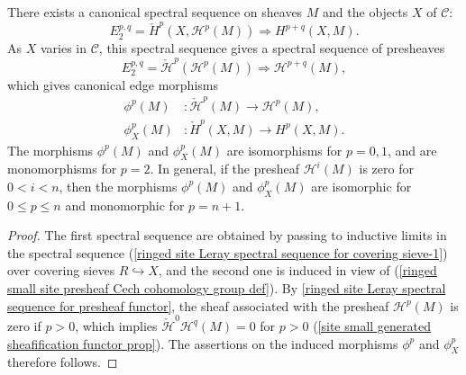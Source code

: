 \begin{corollary}\label{ringed site Cech to derive spectral sequence}
There exists a canonical spectral sequence on sheaves $M$ and the objects $X$ of $\mathcal{C}$:
\begin{equation}\label{ringed site Cech to derive spectral sequence-1}
E_2^{p,q}=\check{H}^p(X,\mathcal{H}^p(M))\Rightarrow H^{p+q}(X,M).
\end{equation}
As $X$ varies in $\mathcal{C}$, this spectral sequence gives a spectral sequence of presheaves
\begin{equation}\label{ringed site Cech to derive spectral sequence-2}
E_2^{p,q}=\check{\mathcal{H}}^p(\mathcal{H}^p(M))\Rightarrow \mathcal{H}^{p+q}(M),
\end{equation}
which gives canonical edge morphisms
\begin{align}
\phi^p(M)&:\check{\mathcal{H}}^p(M)\to \mathcal{H}^p(M),\label{ringed site Cech to derive spectral sequence-3}\\
\phi^p_X(M)&:\check{H}^p(X,M)\to H^p(X,M).\label{ringed site Cech to derive spectral sequence-4}
\end{align}
The morphisms $\phi^p(M)$ and $\phi_X^p(M)$ are isomorphisms for $p=0,1$, and are monomorphisms for $p=2$. In general, if the presheaf $\mathcal{H}^i(M)$ is zero for $0<i<n$, then the morphisms $\phi^p(M)$ and $\phi^p_X(M)$ are isomorphic for $0\leq p\leq n$ and monomorphic for $p=n+1$.
\end{corollary}
\begin{proof}
The first spectral sequence are obtained by passing to inductive limits in the spectral sequence (\ref{ringed site Leray spectral sequence for covering sieve-1}) over covering sieves $R\hookrightarrow X$, and the second one is induced in view of (\ref{ringed small site presheaf Cech cohomology group def}). By \cref{ringed site Leray spectral sequence for presheaf functor}, the sheaf associated with the presheaf $\mathcal{H}^p(M)$ is zero if $p>0$, which implies $\check{\mathcal{H}}^0\mathcal{H}^q(M)=0$ for $p>0$ (\cref{site small generated sheafification functor prop}). The assertions on the induced morphisms $\phi^p$ and $\phi^p_X$ therefore follows.
\end{proof}


